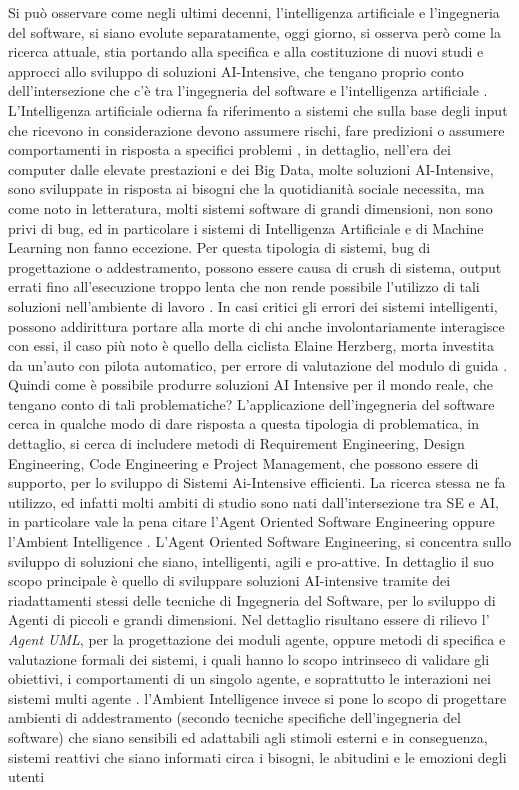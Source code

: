 Si può osservare come negli ultimi decenni, l'intelligenza artificiale e l'ingegneria del software, si siano evolute separatamente, oggi giorno, si osserva però come la ricerca attuale, stia portando alla specifica e alla costituzione di nuovi studi e approcci allo sviluppo di soluzioni AI-Intensive, che tengano proprio conto dell'intersezione che c'è tra l'ingegneria del software e l'intelligenza artificiale \cite{rech2004artificial}. L'Intelligenza artificiale odierna fa riferimento a sistemi che sulla base degli input che ricevono in considerazione devono assumere rischi, fare predizioni o assumere comportamenti in risposta a specifici problemi \cite{shaw2019artificial}, in dettaglio, nell'era dei computer dalle elevate prestazioni e dei Big Data, molte soluzioni AI-Intensive, sono sviluppate in risposta ai bisogni che la quotidianità sociale necessita, ma come noto in letteratura, molti sistemi software di grandi dimensioni, non sono privi di bug, ed in particolare i sistemi di Intelligenza Artificiale e di Machine Learning non fanno eccezione. Per questa tipologia di sistemi, bug di progettazione o addestramento, possono essere causa di crush di sistema, output errati fino all'esecuzione troppo lenta che non rende possibile l'utilizzo di tali soluzioni nell'ambiente di lavoro \cite{ML&Bugs}. In casi critici gli errori dei sistemi intelligenti, possono addirittura portare alla morte di chi anche involontariamente interagisce con essi, il caso più noto è quello della ciclista Elaine Herzberg, morta investita da un'auto con pilota automatico, per errore di valutazione del modulo di guida \cite{shaw2019artificial}. Quindi come è possibile produrre soluzioni AI Intensive per il mondo reale, che tengano conto di tali problematiche? L'applicazione dell'ingegneria del software cerca in qualche modo di dare risposta a questa tipologia di problematica, in dettaglio, si cerca di includere metodi di Requirement Engineering, Design Engineering, Code Engineering e Project Management, che possono essere di supporto, per lo sviluppo di Sistemi Ai-Intensive efficienti. La ricerca stessa ne fa utilizzo, ed infatti molti ambiti di studio sono nati dall'intersezione tra SE e AI, in particolare vale la pena citare l'Agent Oriented Software Engineering oppure l'Ambient Intelligence \cite{jain2011interaction}. L'Agent Oriented Software Engineering, si concentra sullo sviluppo di soluzioni che siano, intelligenti, agili e pro-attive. In dettaglio il suo scopo principale è quello di sviluppare soluzioni AI-intensive tramite dei riadattamenti stessi delle tecniche di Ingegneria del Software, per lo sviluppo di Agenti di piccoli e grandi dimensioni. Nel dettaglio risultano essere di rilievo l' \textit{Agent UML}, per la progettazione dei moduli agente, oppure metodi di specifica e valutazione formali dei sistemi, i quali hanno lo scopo intrinseco di validare gli obiettivi, i comportamenti di un singolo agente, e soprattutto le interazioni nei sistemi multi agente \cite{rech2004artificial}. l'Ambient Intelligence invece si pone lo scopo di progettare ambienti di addestramento (secondo tecniche specifiche dell'ingegneria del software) che siano sensibili ed adattabili agli stimoli esterni e in conseguenza, sistemi reattivi che siano informati circa i bisogni, le abitudini e le emozioni degli utenti 